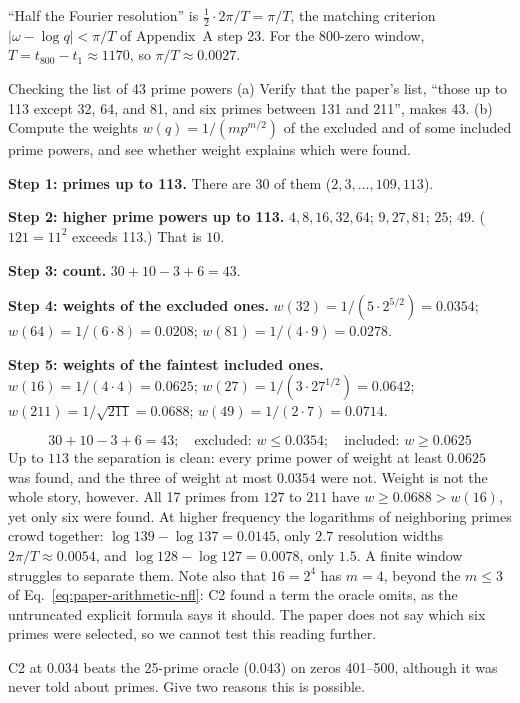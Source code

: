 ``Half the Fourier resolution'' is $\tfrac12\cdot2\pi/T=\pi/T$, the matching criterion $|\omega-\log q|<\pi/T$ of Appendix~A step 23. For the 800-zero window, $T=t_{800}-t_1\approx1170$, so $\pi/T\approx0.0027$.

\begin{sample}{Checking the list of 43 prime powers}
(a) Verify that the paper's list, ``those up to 113 except 32, 64, and 81, and six primes between 131 and 211'', makes 43. (b) Compute the weights $w(q)=1/(mp^{m/2})$ of the excluded and of some included prime powers, and see whether weight explains which were found.

\textbf{Step 1: primes up to 113.} There are $30$ of them ($2,3,\dots,109,113$).

\textbf{Step 2: higher prime powers up to 113.} $4,8,16,32,64$; $9,27,81$; $25$; $49$. ($121=11^2$ exceeds 113.) That is $10$.

\textbf{Step 3: count.} $30+10-3+6=43$. \checkmark

\textbf{Step 4: weights of the excluded ones.} $w(32)=1/(5\cdot2^{5/2})=0.0354$; $w(64)=1/(6\cdot8)=0.0208$; $w(81)=1/(4\cdot9)=0.0278$.

\textbf{Step 5: weights of the faintest included ones.} $w(16)=1/(4\cdot4)=0.0625$; $w(27)=1/(3\cdot27^{1/2})=0.0642$; $w(211)=1/\sqrt{211}=0.0688$; $w(49)=1/(2\cdot7)=0.0714$.

\[
\boxed{30+10-3+6=43;\quad \text{excluded: } w\le0.0354;\quad \text{included: } w\ge0.0625}
\]
Up to $113$ the separation is clean: every prime power of weight at least $0.0625$ was found, and the three of weight at most $0.0354$ were not. Weight is not the whole story, however. All 17 primes from $127$ to $211$ have $w\ge0.0688>w(16)$, yet only six were found. At higher frequency the logarithms of neighboring primes crowd together: $\log139-\log137=0.0145$, only $2.7$ resolution widths $2\pi/T\approx0.0054$, and $\log128-\log127=0.0078$, only $1.5$. A finite window struggles to separate them. Note also that $16=2^4$ has $m=4$, beyond the $m\le3$ of Eq.~\eqref{eq:paper-arithmetic-nfl}: C2 found a term the oracle omits, as the untruncated explicit formula says it should. The paper does not say which six primes were selected, so we cannot test this reading further.
\end{sample}

\begin{checkpoint}
C2 at $0.034$ beats the 25-prime oracle ($0.043$) on zeros 401--500, although it was never told about primes. Give two reasons this is possible.
\end{checkpoint}

